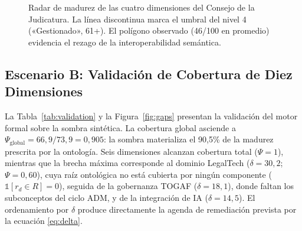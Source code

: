 \documentclass[computers,article,submit,pdftex,moreauthors]{Definitions/mdpi}
\begin{document}
\begin{figure}[H]
\centering
{}
\caption{Radar de madurez de las cuatro dimensiones del Consejo de la Judicatura. La línea discontinua marca el umbral del nivel 4 («Gestionado», 61+). El polígono observado (46/100 en promedio) evidencia el rezago de la interoperabilidad semántica.}
\label{fig:radar}
\end{figure}

\subsection{Escenario B: Validación de Cobertura de Diez Dimensiones}
La Tabla~\ref{tab:validation} y la Figura~\ref{fig:gaps} presentan la validación del motor formal sobre la sombra sintética. La cobertura global asciende a $\Psi_{\mathrm{global}} = 66{,}9/73{,}9 = 0{,}905$: la sombra materializa el 90{,}5\% de la madurez prescrita por la ontología. Seis dimensiones alcanzan cobertura total ($\Psi = 1$), mientras que la brecha máxima corresponde al dominio LegalTech ($\delta = 30{,}2$; $\Psi = 0{,}60$), cuya raíz ontológica no está cubierta por ningún componente ($\mathbb{1}[r_d \in R] = 0$), seguida de la gobernanza TOGAF ($\delta = 18{,}1$), donde faltan los subconceptos del ciclo ADM, y de la integración de IA ($\delta = 14{,}5$). El ordenamiento por $\delta$ produce directamente la agenda de remediación prevista por la ecuación \eqref{eq:delta}.
\end{document}
